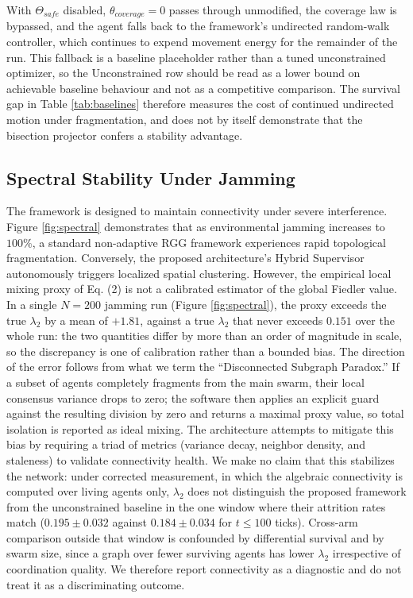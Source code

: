 \documentclass[conference]{IEEEtran}
\begin{document}
With $\Theta_{safe}$ disabled, $\theta_{coverage} = 0$ passes through unmodified, the coverage law is bypassed, and the agent falls back to the framework's undirected random-walk controller, which continues to expend movement energy for the remainder of the run. This fallback is a baseline placeholder rather than a tuned unconstrained optimizer, so the Unconstrained row should be read as a lower bound on achievable baseline behaviour and not as a competitive comparison. The survival gap in Table \ref{tab:baselines} therefore measures the cost of continued undirected motion under fragmentation, and does not by itself demonstrate that the bisection projector confers a stability advantage.

\subsection{Spectral Stability Under Jamming}
The framework is designed to maintain connectivity under severe interference. Figure \ref{fig:spectral} demonstrates that as environmental jamming increases to $100\%$, a standard non-adaptive RGG framework experiences rapid topological fragmentation. Conversely, the proposed architecture's Hybrid Supervisor autonomously triggers localized spatial clustering. However, the empirical local mixing proxy of Eq. (2) is not a calibrated estimator of the global Fiedler value. In a single $N=200$ jamming run (Figure \ref{fig:spectral}), the proxy exceeds the true $\lambda_2$ by a mean of $+1.81$, against a true $\lambda_2$ that never exceeds $0.151$ over the whole run: the two quantities differ by more than an order of magnitude in scale, so the discrepancy is one of calibration rather than a bounded bias. The direction of the error follows from what we term the ``Disconnected Subgraph Paradox.'' If a subset of agents completely fragments from the main swarm, their local consensus variance drops to zero; the software then applies an explicit guard against the resulting division by zero and returns a maximal proxy value, so total isolation is reported as ideal mixing. The architecture attempts to mitigate this bias by requiring a triad of metrics (variance decay, neighbor density, and staleness) to validate connectivity health. We make no claim that this stabilizes the network: under corrected measurement, in which the algebraic connectivity is computed over living agents only, $\lambda_2$ does not distinguish the proposed framework from the unconstrained baseline in the one window where their attrition rates match ($0.195 \pm 0.032$ against $0.184 \pm 0.034$ for $t \le 100$ ticks). Cross-arm comparison outside that window is confounded by differential survival and by swarm size, since a graph over fewer surviving agents has lower $\lambda_2$ irrespective of coordination quality. We therefore report connectivity as a diagnostic and do not treat it as a discriminating outcome.
\end{document}
